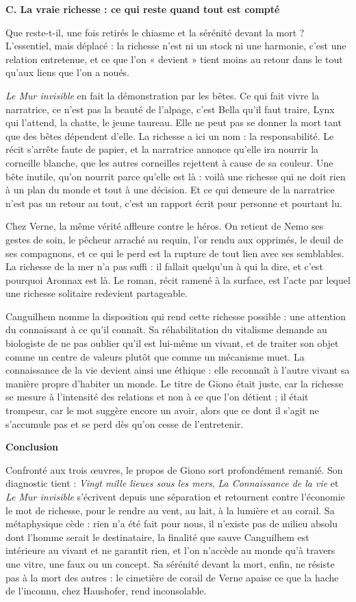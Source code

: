 \documentclass[11pt,a4paper]{article}
\begin{document}
\textbf{C. La vraie richesse : ce qui reste quand tout est compté}

Que reste-t-il, une fois retirés le chiasme et la sérénité devant la mort ? L'essentiel, mais déplacé : la richesse n'est ni un stock ni une harmonie, c'est une relation entretenue, et ce que l'on « devient » tient moins au retour dans le tout qu'aux liens que l'on a noués.

\emph{Le Mur invisible} en fait la démonstration par les bêtes. Ce qui fait vivre la narratrice, ce n'est pas la beauté de l'alpage, c'est Bella qu'il faut traire, Lynx qui l'attend, la chatte, le jeune taureau. Elle ne peut pas se donner la mort tant que des bêtes dépendent d'elle. La richesse a ici un nom : la responsabilité. Le récit s'arrête faute de papier, et la narratrice annonce qu'elle ira nourrir la corneille blanche, que les autres corneilles rejettent à cause de sa couleur. Une bête inutile, qu'on nourrit parce qu'elle est là : voilà une richesse qui ne doit rien à un plan du monde et tout à une décision. Et ce qui demeure de la narratrice n'est pas un retour au tout, c'est un rapport écrit pour personne et pourtant lu.

Chez Verne, la même vérité affleure contre le héros. On retient de Nemo ses gestes de soin, le pêcheur arraché au requin, l'or rendu aux opprimés, le deuil de ses compagnons, et ce qui le perd est la rupture de tout lien avec ses semblables. La richesse de la mer n'a pas suffi : il fallait quelqu'un à qui la dire, et c'est pourquoi Aronnax est là. Le roman, récit ramené à la surface, est l'acte par lequel une richesse solitaire redevient partageable.

Canguilhem nomme la disposition qui rend cette richesse possible : une attention du connaissant à ce qu'il connaît. Sa réhabilitation du vitalisme demande au biologiste de ne pas oublier qu'il est lui-même un vivant, et de traiter son objet comme un centre de valeurs plutôt que comme un mécanisme muet. La connaissance de la vie devient ainsi une éthique : elle reconnaît à l'autre vivant sa manière propre d'habiter un monde. Le titre de Giono était juste, car la richesse se mesure à l'intensité des relations et non à ce que l'on détient ; il était trompeur, car le mot suggère encore un avoir, alors que ce dont il s'agit ne s'accumule pas et se perd dès qu'on cesse de l'entretenir.

\textbf{Conclusion}

Confronté aux trois œuvres, le propos de Giono sort profondément remanié. Son diagnostic tient : \emph{Vingt mille lieues sous les mers}, \emph{La Connaissance de la vie} et \emph{Le Mur invisible} s'écrivent depuis une séparation et retournent contre l'économie le mot de richesse, pour le rendre au vent, au lait, à la lumière et au corail. Sa métaphysique cède : rien n'a été fait pour nous, il n'existe pas de milieu absolu dont l'homme serait le destinataire, la finalité que sauve Canguilhem est intérieure au vivant et ne garantit rien, et l'on n'accède au monde qu'à travers une vitre, une faux ou un concept. Sa sérénité devant la mort, enfin, ne résiste pas à la mort des autres : le cimetière de corail de Verne apaise ce que la hache de l'inconnu, chez Haushofer, rend inconsolable.
\end{document}
